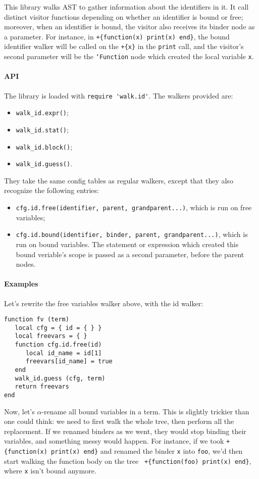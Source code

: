 This library walks AST to gather information about the identifiers in it. It
call distinct visitor functions depending on whether an identifier is bound or
free; moreover, when an identifier is bound, the visitor also receives its
binder node as a parameter. For instance, in {\tt +\{function(x) print(x)
  end\}}, the bound identifier walker will be called on the \verb|+{x}| in the
\verb|print| call, and the visitor's second parameter will be the {\tt`Function}
node which created the local variable {\tt x}.

\paragraph{API}
The library is loaded with \verb|require 'walk.id'|. The walkers provided are:
\begin{itemize}
\item {\tt walk\_id.expr()};
\item {\tt walk\_id.stat()};
\item {\tt walk\_id.block()};
\item {\tt walk\_id.guess()}.
\end{itemize}

They take the same config tables as regular walkers, except that they also
recognize the following entries:
\begin{itemize}
\item {\tt cfg.id.free(identifier, parent, grandparent...)}, which is run on
  free variables;
\item {\tt cfg.id.bound(identifier, binder, parent, grandparent...)}, which is
  run on bound variables. The statement or expression which created this bound
  veriable's scope is passed as a second parameter, before the parent nodes.
\end{itemize}

\paragraph{Examples}
Let's rewrite the free variables walker above, with the id walker:

\begin{Verbatim}[fontsize=\scriptsize]
function fv (term)
   local cfg = { id = { } }
   local freevars = { }
   function cfg.id.free(id)
      local id_name = id[1]
      freevars[id_name] = true
   end
   walk_id.guess (cfg, term)
   return freevars
end
\end{Verbatim}

Now, let's $\alpha$-rename all bound variables in a term. This is slightly
trickier than one could think: we need to first walk the whole tree, then
perform all the replacement. If we renamed binders as we went, they would stop
binding their variables, and something messy would happen. For instance, if we
took {\tt +\{function(x) print(x) end\}} and renamed the binder {\tt x} into
{\tt foo}, we'd then start walking the function body on the tree {\tt
  +\{function(foo) print(x) end\}}, where {\tt x} isn't bound anymore.

